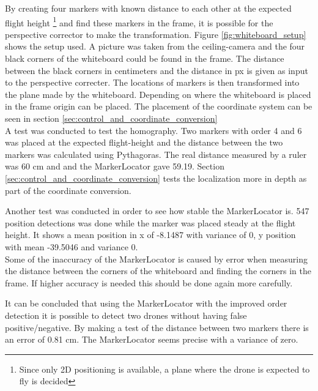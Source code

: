 By creating four markers with known distance to each other at the expected flight height \footnote{Since only 2D positioning is available, a plane where the drone is expected to fly is decided} and find these markers in the frame, it is possible for the perspective corrector to make the transformation.
Figure \ref{fig:whiteboard_setup} shows the setup used. A picture was taken from the ceiling-camera and the four black corners of the whiteboard could be found in the frame. The distance between the black corners in centimeters and the distance in px is given as input to the perspective correcter. The locations of markers is then transformed into the plane made by the whiteboard. Depending on where the whiteboard is placed in the frame origin can be placed. The placement of the coordinate system can be seen in section \ref{sec:control_and_coordinate_conversion}\\


A test was conducted to test the homography. Two markers with order 4 and 6 was placed at the expected flight-height and the distance between the two markers was calculated using Pythagoras. 
The real distance measured by a ruler was 60 cm and and the MarkerLocator gave 59.19.
Section \ref{sec:control_and_coordinate_conversion} tests the localization more in depth as part of the coordinate conversion.

Another test was conducted in order to see how stable the MarkerLocator is. 547 position detections was done while the marker was placed steady at the flight height. It shows a mean position in x of -8.1487 with variance of 0, y position with mean -39.5046 and variance 0. \\

Some of the inaccuracy of the MarkerLocator is caused by error when measuring the distance between the corners of the whiteboard and finding the corners in the frame.
If higher accuracy is needed this should be done again more carefully.

It can be concluded that using the MarkerLocator with the improved order detection it is possible to detect two drones without having false positive/negative. By making a test of the distance between two markers there is an error of 0.81 cm. The MarkerLocator seems precise with a variance of zero. 

